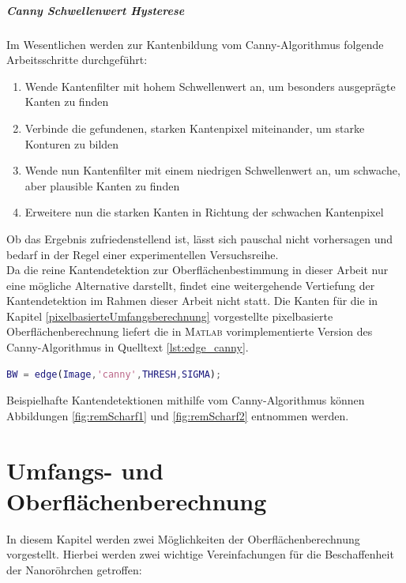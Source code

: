 \documentclass[accentcolor=tud1c, 11pt, toc=bib, toc=listof, captions=abovetable, parskip=half]{tudreport}
\begin{document}
\paragraph{Canny Schwellenwert Hysterese}
Im Wesentlichen werden zur Kantenbildung vom Canny-Algorithmus folgende Arbeitsschritte durchgeführt:
\begin{enumerate}
\item Wende Kantenfilter mit hohem Schwellenwert an, um besonders ausgeprägte Kanten zu finden
\item Verbinde die gefundenen, starken Kantenpixel miteinander, um starke Konturen zu bilden
\item Wende nun Kantenfilter mit einem niedrigen Schwellenwert an, um schwache, aber plausible Kanten zu finden
\item Erweitere nun die starken Kanten in Richtung der schwachen Kantenpixel
\end{enumerate}

Ob das Ergebnis zufriedenstellend ist, lässt sich pauschal nicht vorhersagen und bedarf in der Regel einer experimentellen Versuchsreihe.\\
Da die reine Kantendetektion zur Oberflächenbestimmung in dieser Arbeit nur eine mögliche Alternative darstellt, findet eine weitergehende Vertiefung der Kantendetektion im Rahmen dieser Arbeit nicht statt. Die Kanten für die in Kapitel \ref{pixelbasierteUmfangsberechnung} vorgestellte pixelbasierte Oberflächenberechnung liefert die in \textsc{Matlab} vorimplementierte Version des Canny-Algorithmus in Quelltext \ref{lst:edge_canny}.

\begin{lstlisting}[language=MATLAB, caption=Methodensignatur der Funktion \lstinline|edge| unter Auswahl des Canny Filters, label=lst:edge_canny]
BW = edge(Image,'canny',THRESH,SIGMA);
\end{lstlisting}

Beispielhafte Kantendetektionen mithilfe vom Canny-Algorithmus können Abbildungen \ref{fig:remScharf1} und \ref{fig:remScharf2} entnommen werden.

\chapter{Umfangs- und Oberflächenberechnung}
\label{ch:umfangsberechnung}
In diesem Kapitel werden zwei Möglichkeiten der Oberflächenberechnung vorgestellt. Hierbei werden zwei wichtige Vereinfachungen für die Beschaffenheit der Nanoröhrchen getroffen:
\end{document}
